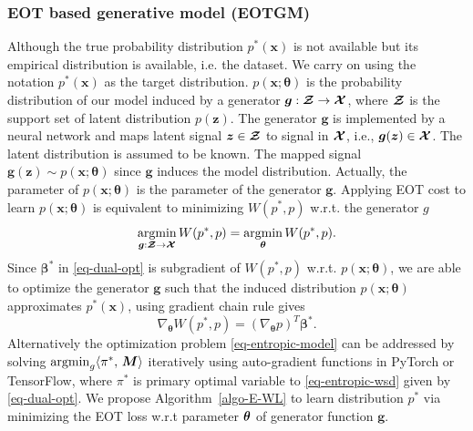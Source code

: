 \subsubsection{EOT based generative model (EOTGM)}\label{subsec-gmeot}
{Although the true probability distribution $p^{\ast}(\bm{x})$ is not available but its empirical distribution is available, i.e. the dataset. We carry on using the notation $p^{\ast}(\bm{x})$ as the target distribution. $p(\bm{x};\bm{\theta})$ is the probability distribution of our model induced by a generator $\bm{g}: \bm{\mathcal{Z}} \rightarrow \bm{\mathcal{X}}$, where $\bm{\mathcal{Z}}$ is the support set of latent distribution $p(\bm{z})$. The generator $\bm{g}$ is implemented by a neural network and maps latent signal $\bm{z} \in \bm{\mathcal{Z}}$ to signal in $\bm{\mathcal{X}}$, i.e., $\bm{g}(\bm{z}) \in \bm{\mathcal{X}}$. The latent distribution is assumed to be known. The mapped signal $\bm{g}(\bm{z}) \sim p(\bm{x};\bm{\theta})$ since $\bm{g}$ induces the model distribution. Actually, the parameter of $p(\bm{x};\bm{\theta})$ is the parameter of the generator $\bm{g}$. Applying EOT cost to learn $p(\bm{x}; \bm{\theta})$ is equivalent to minimizing $W(p^{\ast}, p)$ w.r.t. the generator $g$}
\begin{equation}\label{eq-entropic-model}
  \underset{\bm{g}:\bm{\mathcal{Z}}\to \bm{\mathcal{X}}}{\operatorname{argmin}}\, W(p^{\ast}, p) = \underset{\bm{\theta}}{\operatorname{argmin}}\, W(p^{\ast}, p).
\end{equation}
Since $\bm{\beta}^{\ast}$ in \eqref{eq-dual-opt} is subgradient of $W(p^{\ast}, p)$ w.r.t. $p(\bm{x};\bm{\theta})$, we are able to
optimize the generator $\bm{g}$ such that the induced distribution $p(\bm{x};\bm{\theta})$ approximates $p^{\ast}(\bm{x})$, using gradient chain rule gives
\begin{equation}
  \nabla_{\bm{\theta}}W(p^{\ast}, p) = \left(\nabla_{\bm{\theta}}p\right)^{T} \bm{\beta}^{\ast}.
\end{equation}
Alternatively the optimization problem \eqref{eq-entropic-model} can be addressed by solving $\operatorname{argmin}_{g}\langle \pi^{\ast},\,\bm{M}\rangle $ iteratively using auto-gradient functions in PyTorch\cite{pytorch} or
TensorFlow\cite{tensorflow}, where $\pi^{\ast}$ is primary optimal
variable to \eqref{eq-entropic-wsd} given by \eqref{eq-dual-opt}. We
propose Algorithm~\ref{algo-E-WL} to learn distribution $p^{\ast}$
via minimizing the EOT loss w.r.t parameter $\bm{\theta}$ of generator function $\bm{g}$.
